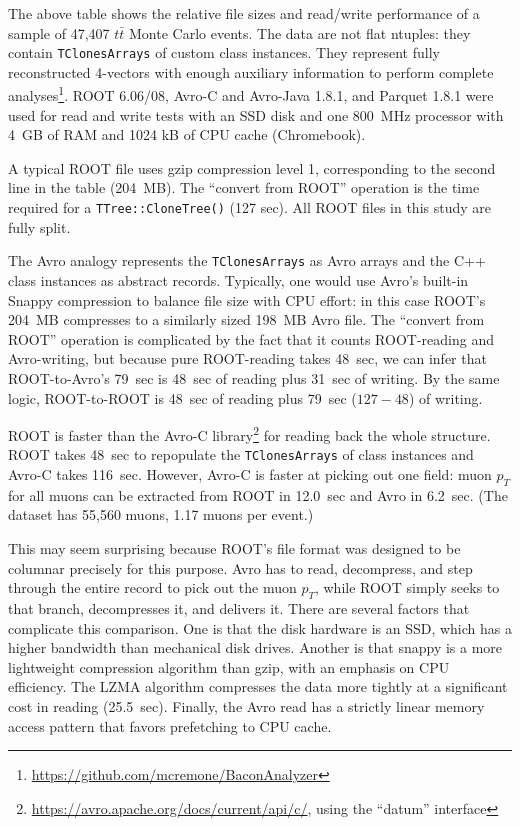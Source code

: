 \documentclass{article}
\begin{document}
The above table shows the relative file sizes and read/write performance of a sample of 47,407 $t\bar{t}$ Monte Carlo events. The data are not flat ntuples: they contain {\tt TClonesArrays} of custom class instances. They represent fully reconstructed 4-vectors with enough auxiliary information to perform complete analyses\footnote{\url{https://github.com/mcremone/BaconAnalyzer}}. ROOT 6.06/08, Avro-C and Avro-Java 1.8.1, and Parquet 1.8.1 were used for read and write tests with an SSD disk and one 800~MHz processor with 4~GB of RAM and 1024 kB of CPU cache (Chromebook).

A typical ROOT file uses gzip compression level 1, corresponding to the second line in the table (204~MB). The ``convert from ROOT'' operation is the time required for a {\tt TTree::CloneTree()} (127 sec). All ROOT files in this study are fully split.

The Avro analogy represents the {\tt TClonesArrays} as Avro arrays and the C++ class instances as abstract records. Typically, one would use Avro's built-in Snappy compression to balance file size with CPU effort: in this case ROOT's 204~MB compresses to a similarly sized 198~MB Avro file. The ``convert from ROOT'' operation is complicated by the fact that it counts ROOT-reading and Avro-writing, but because pure ROOT-reading takes 48~sec, we can infer that ROOT-to-Avro's 79~sec is 48~sec of reading plus 31~sec of writing. By the same logic, ROOT-to-ROOT is 48~sec of reading plus 79~sec ($127 - 48$) of writing.

ROOT is faster than the Avro-C library\footnote{\url{https://avro.apache.org/docs/current/api/c/}, using the ``datum'' interface} for reading back the whole structure. ROOT takes 48~sec to repopulate the {\tt TClonesArrays} of class instances and Avro-C takes 116~sec. However, Avro-C is faster at picking out one field: muon $p_T$ for all muons can be extracted from ROOT in 12.0~sec and Avro in 6.2~sec. (The dataset has 55,560 muons, 1.17 muons per event.)

This may seem surprising because ROOT's file format was designed to be columnar precisely for this purpose. Avro has to read, decompress, and step through the entire record to pick out the muon $p_T$, while ROOT simply seeks to that branch, decompresses it, and delivers it. There are several factors that complicate this comparison. One is that the disk hardware is an SSD, which has a higher bandwidth than mechanical disk drives. Another is that snappy is a more lightweight compression algorithm than gzip, with an emphasis on CPU efficiency. The LZMA algorithm compresses the data more tightly at a significant cost in reading (25.5~sec). Finally, the Avro read has a strictly linear memory access pattern that favors prefetching to CPU cache.
\end{document}
